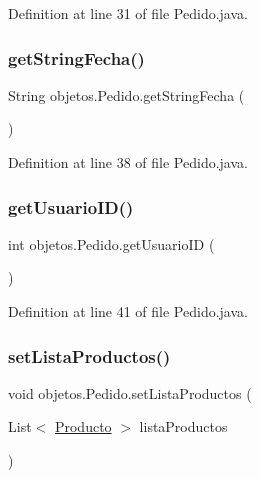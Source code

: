 Definition at line 31 of file Pedido.\+java.

\mbox{\label{classobjetos_1_1_pedido_af2c6fe4c929f1fce6443e3ffcb2c0a45}} 
\subsubsection{\texorpdfstring{get\+String\+Fecha()}{getStringFecha()}}
{\footnotesize\ttfamily String objetos.\+Pedido.\+get\+String\+Fecha (\begin{DoxyParamCaption}{ }\end{DoxyParamCaption})}



Definition at line 38 of file Pedido.\+java.

\mbox{\label{classobjetos_1_1_pedido_afed5e1d427d944ead970861ef07be474}} 
\subsubsection{\texorpdfstring{get\+Usuario\+I\+D()}{getUsuarioID()}}
{\footnotesize\ttfamily int objetos.\+Pedido.\+get\+Usuario\+ID (\begin{DoxyParamCaption}{ }\end{DoxyParamCaption})}



Definition at line 41 of file Pedido.\+java.

\mbox{\label{classobjetos_1_1_pedido_a642984750b50555899811e39208729b4}} 
\subsubsection{\texorpdfstring{set\+Lista\+Productos()}{setListaProductos()}}
{\footnotesize\ttfamily void objetos.\+Pedido.\+set\+Lista\+Productos (\begin{DoxyParamCaption}\item[{List$<$ \mbox{\hyperlink{classobjetos_1_1_producto}{Producto}} $>$}]{lista\+Productos }\end{DoxyParamCaption})}



